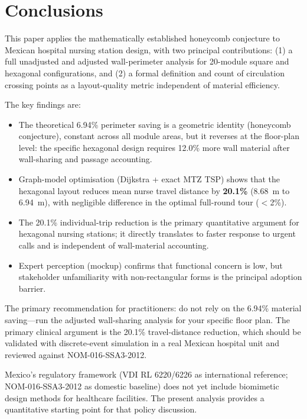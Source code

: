 \documentclass[12pt,a4paper]{article}
\begin{document}
\section{Conclusions}
\label{sec:conclusions}

This paper applies the mathematically established honeycomb conjecture to
Mexican hospital nursing station design, with two principal contributions:
(1) a full unadjusted and adjusted wall-perimeter analysis for 20-module square
and hexagonal configurations, and (2) a formal definition and count of
circulation crossing points as a layout-quality metric independent of
material efficiency.

The key findings are:
\begin{itemize}[noitemsep]
  \item The theoretical 6.94\% perimeter saving is a geometric identity (honeycomb
    conjecture), constant across all module areas, but it reverses at the floor-plan
    level: the specific hexagonal design requires 12.0\% more wall material after
    wall-sharing and passage accounting.
  \item Graph-model optimisation (Dijkstra + exact MTZ TSP) shows that the hexagonal
    layout reduces mean nurse travel distance by \textbf{20.1\%}
    (\SI{8.68}{\metre} to \SI{6.94}{\metre}), with negligible difference in the
    optimal full-round tour ($<$2\%).
  \item The 20.1\% individual-trip reduction is the primary quantitative argument for
    hexagonal nursing stations; it directly translates to faster response to urgent calls
    and is independent of wall-material accounting.
  \item Expert perception (mockup) confirms that functional concern is low, but
    stakeholder unfamiliarity with non-rectangular forms is the principal adoption barrier.
\end{itemize}

The primary recommendation for practitioners: do not rely on the 6.94\% material
saving---run the adjusted wall-sharing analysis for your specific floor plan.
The primary clinical argument is the 20.1\% travel-distance reduction, which
should be validated with discrete-event simulation in a real Mexican hospital unit
and reviewed against NOM-016-SSA3-2012.

Mexico's regulatory framework (VDI RL 6220/6226 as international reference;
NOM-016-SSA3-2012 as domestic baseline) does not yet include biomimetic design
methods for healthcare facilities.
The present analysis provides a quantitative starting point for that policy discussion.
\end{document}
